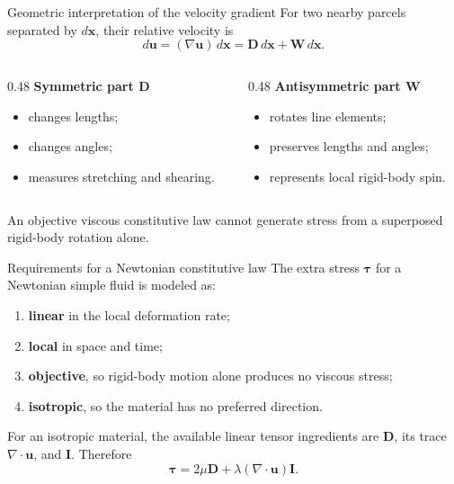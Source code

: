 \documentclass[aspectratio=169,11pt]{beamer}
\newcommand{\uvec}{\bm{u}}
\newcommand{\xvec}{\bm{x}}
\newcommand{\taustress}{\bm{\tau}}
\newcommand{\Dtensor}{\mathbf{D}}
\newcommand{\Wtensor}{\mathbf{W}}
\newcommand{\Identity}{\mathbf{I}}
\begin{document}
\begin{frame}{Geometric interpretation of the velocity gradient}
For two nearby parcels separated by $d\xvec$, their relative velocity is
\[
  d\uvec=(\nabla\uvec)\,d\xvec
  =\Dtensor\,d\xvec+\Wtensor\,d\xvec.
\]
\begin{columns}[T,onlytextwidth]
\begin{column}{0.48\textwidth}
\textbf{Symmetric part $\Dtensor$}
\begin{itemize}\itemsep5pt
  \item changes lengths;
  \item changes angles;
  \item measures stretching and shearing.
\end{itemize}
\end{column}
\begin{column}{0.48\textwidth}
\textbf{Antisymmetric part $\Wtensor$}
\begin{itemize}\itemsep5pt
  \item rotates line elements;
  \item preserves lengths and angles;
  \item represents local rigid-body spin.
\end{itemize}
\end{column}
\end{columns}
\begin{punchbox}
\small An objective viscous constitutive law cannot generate stress from a superposed rigid-body rotation alone.
\end{punchbox}
\end{frame}

\begin{frame}{Requirements for a Newtonian constitutive law}
The extra stress $\taustress$ for a Newtonian simple fluid is modeled as:
\begin{enumerate}\itemsep6pt
  \item \textbf{linear} in the local deformation rate;
  \item \textbf{local} in space and time;
  \item \textbf{objective}, so rigid-body motion alone produces no viscous stress;
  \item \textbf{isotropic}, so the material has no preferred direction.
\end{enumerate}
For an isotropic material, the available linear tensor ingredients are $\Dtensor$, its trace $\nabla\cdot\uvec$, and $\Identity$. Therefore
\[
  \taustress=2\mu\Dtensor
  +\lambda(\nabla\cdot\uvec)\Identity.
\]
\end{frame}
\end{document}
